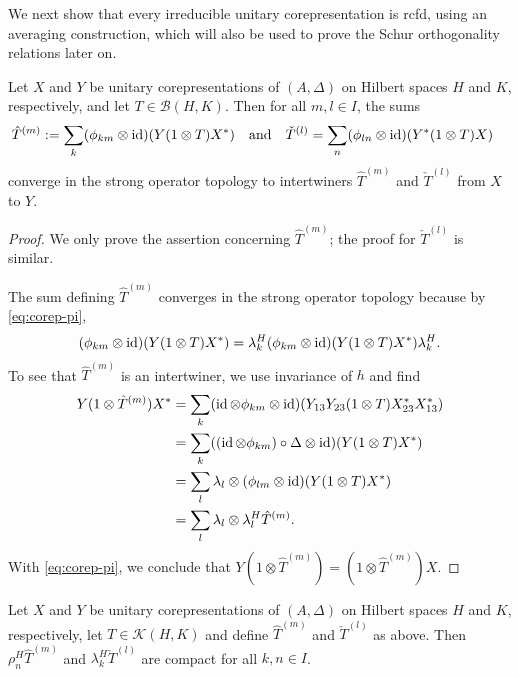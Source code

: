 We next show that every irreducible unitary corepresentation
is rcfd, using an averaging construction, which
will also be used to prove the Schur orthogonality relations later on.
\begin{Lem} \label{lem:intertwiner-averaged}
  Let $X$ and $Y$ be unitary corepresentations of $(A,\Delta)$ on Hilbert spaces $H$ and $K$,
  respectively, and let $T \in \mathcal{B}(H,K)$. Then for all $m,l \in I$, the sums
  \begin{align*}
    \hat T^{(m)} &:= \sum_{k} (\phi_{km} \otimes \operatorname{id})(Y(1 \otimes T)X^{*}) \quad \text{and} \quad
    \check T^{(l)}=\sum_{n} (\phi_{ln}\otimes \operatorname{id})(Y^{*}(1 \otimes T)X)
  \end{align*}
  converge in the strong operator topology to intertwiners $\hat
  T^{(m)}$ and $\check T^{(l)}$ from $X$ to $Y$.
\end{Lem}
\begin{proof}
  We only prove the assertion concerning $\hat T^{(m)}$; the proof for $\check T^{(l)}$ is similar.
  
  The sum defining $\hat T^{(m)}$ converges in the strong operator topology because by
  \eqref{eq:corep-pi},
  \begin{align*}
    (\phi_{km} \otimes \operatorname{id})(Y(1 \otimes T)X^{*}) = \lambda^{H}_{k}
    (\phi_{km} \otimes \operatorname{id})(Y(1 \otimes T)X^{*}) \lambda^{H}_{k}.
  \end{align*}
  To see that $\hat T^{(m)}$ is an intertwiner, we use invariance of $h$ and find
  \begin{align*}
    Y(1 \otimes \hat T^{(m)})X^{*} &=
    \sum_{k} (\operatorname{id} \otimes \phi_{km} \otimes \operatorname{id})(Y_{13}Y_{23}(1 \otimes T)X^{*}_{23}X^{*}_{13}) \\
    &= \sum_{k} ((\operatorname{id} \otimes \phi_{km})\circ \Delta \otimes \operatorname{id})(Y(1 \otimes T)X^{*}) \\
    &=\sum_{l} \lambda_{l} \otimes (\phi_{lm} \otimes \operatorname{id})(Y(1\otimes T)X^{*}) \\
    &= \sum_{l} \lambda_{l}   \otimes \lambda^{H}_{l} \hat T^{(m)}.
  \end{align*}%
  With \eqref{eq:corep-pi}, we conclude that $Y(1\otimes \hat T^{(m)})
  = (1 \otimes \hat T^{(m)})X$.
\end{proof} 
\begin{Lem} \label{lem:intertwiner-compact} Let $X$ and $Y$ be unitary corepresentations of
  $(A,\Delta)$ on Hilbert spaces $H$ and $K$, respectively, let $T \in \mathcal{K}(H,K)$ and define
  $\hat T^{(m)}$ and $\check T^{(l)}$ as above. Then $\rho^{H}_{n}\hat T^{(m)}$ and
  $\lambda^{H}_{k}\check T^{(l)}$ are compact for all $k,n\in I$.
\end{Lem}
